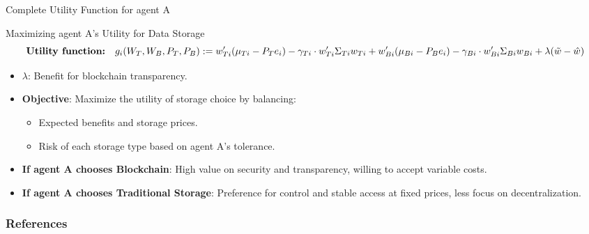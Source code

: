 \documentclass[aspectratio=169]{beamer}
\begin{document}
\begin{frame}{Complete Utility Function for agent A}
    \begin{block}{Maximizing agent A’s Utility for Data Storage}
    \[
    \textbf{Utility function:} \quad g_i(W_T, W_B, P_T, P_B) := w_{Ti}' (\mu_{Ti} - P_T e_i) - \gamma_{Ti} \cdot w_{Ti}' \Sigma_{Ti} w_{Ti} + \\
    w_{Bi}' (\mu_{Bi} - P_B e_i) - \gamma_{Bi} \cdot w_{Bi}' \Sigma_{Bi} w_{Bi} + \lambda(\tilde w - \hat w)
    \]
    \end{block}
    \begin{itemize}
    \item $\lambda$: Benefit for blockchain transparency. 
        \item \textbf{Objective}: Maximize the utility of storage choice by balancing:
        \begin{itemize}
            \item Expected benefits and storage prices.
            \item Risk of each storage type based on agent A's tolerance.
        \end{itemize}
        \item \textbf{If agent A chooses Blockchain}: High value on security and transparency, willing to accept variable costs.
        \item \textbf{If agent A chooses Traditional Storage}: Preference for control and stable access at fixed prices, less focus on decentralization.
    \end{itemize}
\end{frame}
    
    
	\begin{frame}[allowframebreaks]
		\frametitle{References}
		\printbibliography
	\end{frame}
\end{document}
